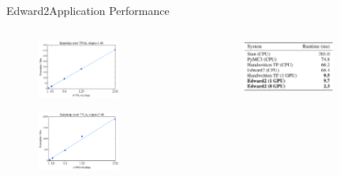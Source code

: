 \documentclass[AERbeamer%
              ,optEnglish%
              ,optBiber%
              ,optBibstyleAlphabetic%
              ,optBeamerClassicFormat%
              ]{AERlatex}%
\begin{document}
\begin{frame}[c]{Edward2}{Application Performance}
    \centering
    \begin{columns}[T]
        \begin{column}{0.48\textwidth}
            \centering
            \begin{figure}
                \centering
                \includegraphics[width=0.65\textwidth]{Edward2Vector-QuantizedVAE.png}
            \end{figure}
            \begin{figure}
                \centering
                \includegraphics[width=0.65\textwidth]{Edward2ImageTransformer.png}
            \end{figure}
        \end{column}
        \begin{column}{0.48\textwidth}
            \centering
            \begin{figure}
                \centering
                \includegraphics[width=0.7\textwidth]{Edward2PerformanceComparison.png}

\end{figure}
\end{column}
\end{columns}
\end{frame}
\end{document}

